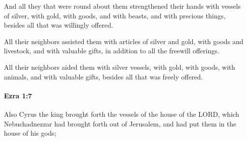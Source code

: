 			\begin{versebox}
					\item[BHS] 
					\item[LXX] 
					\item[ASV] And all they that were round about them strengthened their hands with vessels of silver, with gold, with goods, and with beasts, and with precious things, besides all that was willingly offered.
					\item[NIV] All their neighbors assisted them with articles of silver and gold, with goods and livestock, and with valuable gifts, in addition to all the freewill offerings.
					\item[NRSV] All their neighbors aided them with silver vessels, with gold, with goods, with animals, and with valuable gifts, besides all that was freely offered.
			\end{versebox}

		\paragraph{Ezra 1:7} %
			\label{EZRA-1-7}

			Also Cyrus the king brought forth the vessels of the house of the LORD, which Nebuchadnezzar had brought forth out of Jerusalem, and had put them in the house of his gods;

